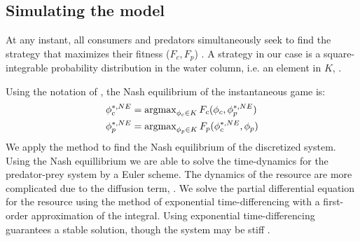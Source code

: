\subsection{Simulating the model}




At any instant, all consumers and predators simultaneously seek to find the strategy that maximizes their fitness ($F_c, F_p$) . A strategy in our case is a square-integrable probability distribution in the water column, i.e. an element in $K$, .

Using the notation of , the Nash equilibrium of the instantaneous game is:
\begin{equation}
  \label{eq:nash_equilibria}
  \begin{split}
  	\phi_c^{*,NE} &=  \argmax_{\phi_c \in K}  F_c(\phi_c, \phi_p^{*,NE}) \\
  	\phi_p^{*,NE} &=  \argmax_{\phi_p \in K} F_p(\phi_c^{*,NE}, \phi_p)
  \end{split}
\end{equation}
We apply the method  to find the Nash equilibrium of the discretized system. Using the Nash equillibrium  we are able to solve the time-dynamics for the predator-prey system  by a Euler scheme. The dynamics of the resource are more complicated due to the diffusion term, . We solve the partial differential equation for the resource using the method of exponential time-differencing \citep{hochbruck2010exponential} with a first-order approximation of the integral. Using exponential time-differencing guarantees a stable solution, though the system may be stiff \cite{hochbruck2010exponential}.

